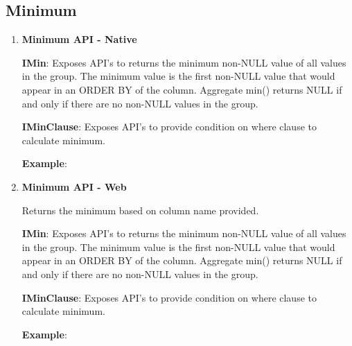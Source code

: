 	\subsection{Minimum} 

		\begin{enumerate}

			\item \small \textbf{Minimum API - Native}
				\par 
					
					
		
				\textbf{IMin}:      Exposes API's to returns the minimum non-NULL value of all values in the group.
						The minimum value is the first non-NULL value that would appear in an ORDER BY of the column.
						Aggregate min() returns NULL if and only if there are no non-NULL values in the group.


					

			
				\textbf{IMinClause}: Exposes API's to provide condition on where clause to calculate minimum.
					
	
				\textbf{Example}: 
					

			\item \small \textbf{Minimum API - Web}
				\par 
				Returns the minimum based on column name provided.
					
		
				\textbf{IMin}:      Exposes API's to returns the minimum non-NULL value of all values in the group.
						The minimum value is the first non-NULL value that would appear in an ORDER BY of the column.
						Aggregate min() returns NULL if and only if there are no non-NULL values in the group.


					

			
				\textbf{IMinClause}: Exposes API's to provide condition on where clause to calculate minimum.
					
	
				\textbf{Example}: 
					

		\end{enumerate}




